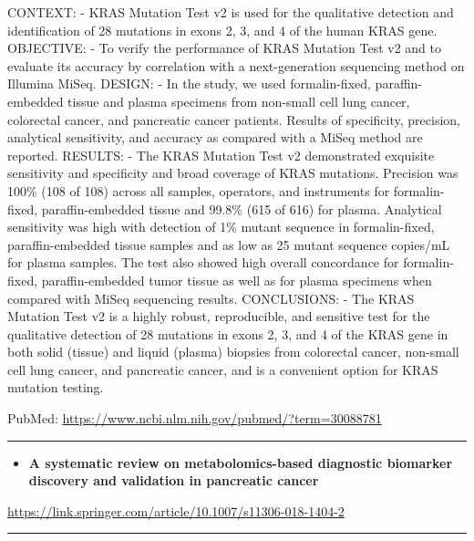 \documentclass[]{article}
\providecommand{\tightlist}{%
  \setlength{\itemsep}{0pt}\setlength{\parskip}{0pt}}
\begin{document}
CONTEXT: - KRAS Mutation Test v2 is used for the qualitative detection
and identification of 28 mutations in exons 2, 3, and 4 of the human
KRAS gene. OBJECTIVE: - To verify the performance of KRAS Mutation Test
v2 and to evaluate its accuracy by correlation with a next-generation
sequencing method on Illumina MiSeq. DESIGN: - In the study, we used
formalin-fixed, paraffin-embedded tissue and plasma specimens from
non-small cell lung cancer, colorectal cancer, and pancreatic cancer
patients. Results of specificity, precision, analytical sensitivity, and
accuracy as compared with a MiSeq method are reported. RESULTS: - The
KRAS Mutation Test v2 demonstrated exquisite sensitivity and specificity
and broad coverage of KRAS mutations. Precision was 100\% (108 of 108)
across all samples, operators, and instruments for formalin-fixed,
paraffin-embedded tissue and 99.8\% (615 of 616) for plasma. Analytical
sensitivity was high with detection of 1\% mutant sequence in
formalin-fixed, paraffin-embedded tissue samples and as low as 25 mutant
sequence copies/mL for plasma samples. The test also showed high overall
concordance for formalin-fixed, paraffin-embedded tumor tissue as well
as for plasma specimens when compared with MiSeq sequencing results.
CONCLUSIONS: - The KRAS Mutation Test v2 is a highly robust,
reproducible, and sensitive test for the qualitative detection of 28
mutations in exons 2, 3, and 4 of the KRAS gene in both solid (tissue)
and liquid (plasma) biopsies from colorectal cancer, non-small cell lung
cancer, and pancreatic cancer, and is a convenient option for KRAS
mutation testing.

PubMed: \url{https://www.ncbi.nlm.nih.gov/pubmed/?term=30088781}

{}

{}

\begin{center}\rule{0.5\linewidth}{\linethickness}\end{center}

\begin{itemize}
\tightlist
\item
  \textbf{A systematic review on metabolomics-based diagnostic biomarker
  discovery and validation in pancreatic cancer}
\end{itemize}

\url{https://link.springer.com/article/10.1007/s11306-018-1404-2}

\begin{center}\rule{0.5\linewidth}{\linethickness}\end{center}
\end{document}
